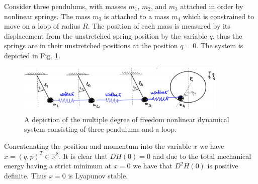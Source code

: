 \begin{ex}
	Consider three pendulums, with masses $m_1$, $m_2$, and $m_3$ attached in order by nonlinear springs. The mass $m_3$ is attached to a mass $m_4$ which is constrained to move on a loop of radius $R$. The position of each mass is measured by its displacement from the unstretched spring position by the variable $q$, thus the springs are in their unstretched positions at the position $q=0$. The system is depicted in Fig. \ref{fig:multi_dof_mech}.
\begin{figure}[h!]
	\centering
	\includegraphics[width=0.9\textwidth]{figures/ch8/17multi_dof_mech.png}
	\caption{A depiction of the multiple degree of freedom nonlinear dynamical system consisting of three pendulums and a loop.}
	\label{fig:multi_dof_mech}
\end{figure}

Concatenating the position and momentum into the variable $x$ we have $x=(q,p)^{T}\in \mathbb{R}^{8}$. It is clear that $DH(0) = 0$ and due to the total mechanical energy having a strict minimum at $x=0$ we have that $D^2H(0)$ is positive definite. Thus $x=0$ is Lyapunov stable.
\end{ex}

